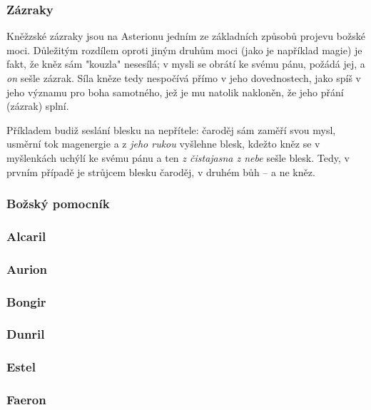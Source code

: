 \documentclass[../main.tex]{subfiles}
\begin{document}
\subsubsection{Zázraky}
\label{sec:zazraky}
Kněžzské zázraky jsou na Asterionu jedním ze základních způsobů projevu božské moci. Důležitým rozdílem oproti jiným druhům moci (jako je například magie) je fakt, že kněz sám "kouzla" nesesílá; v mysli se obrátí ke svému pánu, požádá jej, a \emph{on} sešle zázrak. Síla kněze tedy nespočívá přímo v jeho dovednostech, jako spíš v jeho významu pro boha samotného, jež je mu natolik nakloněn, že jeho přání (zázrak) splní. 
\begin{příklad}
	Příkladem budiž seslání blesku na nepřítele: čaroděj sám zaměří svou mysl, usměrní tok magenergie a z \emph{jeho rukou} vyšlehne blesk, kdežto kněz se v myšlenkách uchýlí ke svému pánu a ten \emph{z čistajasna z nebe} sešle blesk. Tedy, v prvním případě je strůjcem blesku čaroděj, v druhém bůh – a ne kněz.
\end{příklad}
\subsubsection*{Božský pomocník}
\label{sec:bozsky-pomocnik}

\subsubsection{Alcaril}
\label{sec:alcaril}

\subsubsection{Aurion}
\label{sec:aurion}

\subsubsection{Bongir}
\label{sec:bongir}

\subsubsection{Dunril}
\label{sec:dunril}

\subsubsection{Estel}
\label{sec:estel}

\subsubsection{Faeron}
\label{sec:faeron}
\end{document}
